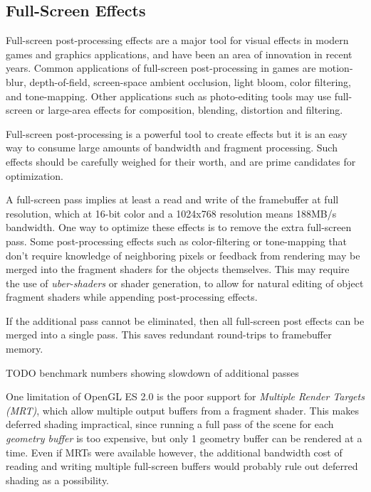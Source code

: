 \subsection {Full-Screen Effects}\label{Jon-McCaffrey-Full-Screen-Effects}
Full-screen post-processing effects are a major tool for visual effects in
modern games and graphics applications, and have been an area of innovation in
recent years.   Common applications of full-screen post-processing in games are
motion-blur, depth-of-field, screen-space ambient occlusion, light bloom, color
filtering, and tone-mapping.  Other applications such as photo-editing tools
may use full-screen or large-area effects for composition, blending, distortion
and filtering.

Full-screen post-processing is a powerful tool to create effects but it is an
easy way to consume large amounts of bandwidth and fragment processing.  Such
effects should be carefully weighed for their worth, and are prime candidates
for optimization.  

A full-screen pass implies at least a read and write of the framebuffer at full
resolution, which at 16-bit color and a 1024x768 resolution means 188MB/s
bandwidth.  One way to optimize these effects is to remove the extra
full-screen pass.  Some post-processing effects such as color-filtering or
tone-mapping that don't require knowledge of neighboring pixels or feedback
from rendering may be merged into the fragment shaders for the objects
themselves.  This may require the use of \textit{uber-shaders} or shader
generation, to allow for natural editing of object fragment shaders while
appending post-processing effects.

If the additional pass cannot be eliminated, then all full-screen post effects
can be merged into a single pass.  This saves redundant round-trips to
framebuffer memory.

TODO benchmark numbers showing slowdown of additional passes


One limitation of OpenGL ES 2.0 is the poor support for \textit{Multiple Render
Targets (MRT)}, which allow multiple output buffers from a fragment shader.
This makes deferred shading impractical, since running a full pass of the
scene for each \textit{geometry buffer} is too expensive, but only 1 geometry
buffer can be rendered at a time.  Even if MRTs were available however, the
additional bandwidth cost of reading and writing multiple full-screen buffers
would probably rule out deferred shading as a possibility.

